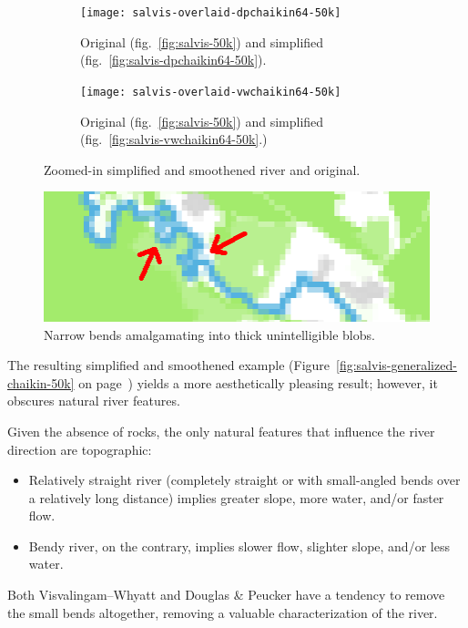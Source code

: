\documentclass[a4paper]{article}
\newcommand{\onpage}[1]{\ref{#1} on page~\pageref{#1}}
\newcommand{\DP}{Douglas \& Peucker}
\newcommand{\VW}{Visvalingam--Whyatt}
\begin{document}
\begin{figure}[ht!]
    \centering
    \begin{subfigure}[b]{.49\textwidth}
        \texttt{[image: salvis-overlaid-dpchaikin64-50k]}

        \caption{Original (fig.~\ref{fig:salvis-50k}) and simplified
        (fig.~\ref{fig:salvis-dpchaikin64-50k}).}

    \end{subfigure}
    \hfill
    \begin{subfigure}[b]{.49\textwidth}
        \texttt{[image: salvis-overlaid-vwchaikin64-50k]}

        \caption{Original (fig.~\ref{fig:salvis-50k}) and simplified
            (fig.~\ref{fig:salvis-vwchaikin64-50k}.)}

    \end{subfigure}
    \caption{Zoomed-in simplified and smoothened river and original.}
    \label{fig:salvis-overlaid-generalized-chaikin-50k}
\end{figure}

\begin{figure}[b!]
    \centering
    \includegraphics[width=.9\textwidth]{amalgamate1}
    \caption{Narrow bends amalgamating into thick unintelligible blobs.}
    \label{fig:pixel-amalgamation}
\end{figure}

The resulting simplified and smoothened example
(Figure~\onpage{fig:salvis-generalized-chaikin-50k}) yields a more
aesthetically pleasing result; however, it obscures natural river features.

Given the absence of rocks, the only natural features that influence the river
direction are topographic:

\begin{itemize}
    \item Relatively straight river (completely straight or with small-angled
        bends over a relatively long distance) implies greater slope, more
        water, and/or faster flow.

    \item Bendy river, on the contrary, implies slower flow, slighter slope,
        and/or less water.

\end{itemize}
Both {\VW} and {\DP} have a tendency to remove the small bends altogether,
removing a valuable characterization of the river.
\end{document}
